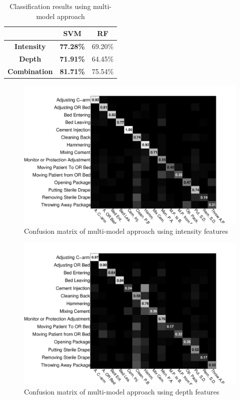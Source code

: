 \begin{table}[H]
\centering
\begin{tabular}{|c|c|c|}
\hline
                     & \textbf{SVM}     & \textbf{RF} \\ \hline
\textbf{Intensity}   & \textbf{77.28\%} & 69.20\%     \\ \hline
\textbf{Depth}       & \textbf{71.91\%} & 64.45\%     \\ \hline
\textbf{Combination} & \textbf{81.71\%} & 75.54\%     \\ \hline
\end{tabular}
\caption{Classification results using multi-model approach}
\label{table:multiModelResults}
\end{table}

\begin{figure}[H]
\begin{center}
\includegraphics[scale=0.4]{Figures/intensity-multimodel}
\end{center}
\caption{Confusion matrix of multi-model approach using intensity features 
\label{fig:intensityMultiModelConfusionMatrix}}
\end{figure}
        
\begin{figure}[H]
\begin{center}
\includegraphics[scale=0.4]{Figures/depth-multimodel}
\end{center}
\caption{Confusion matrix of multi-model approach using depth features  
\label{fig:depthMultiModelConfusionMatrix}}
\end{figure}

